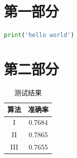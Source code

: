 \documentclass[a4paper,12pt]{report}
\begin{document}
\begin{appendix}

\chapter{第一部分}

\begin{lstlisting}[language=python]
print('hello world') 
\end{lstlisting}

\chapter{第二部分}

\begin{table}[htbp]
    \centering
    \caption{测试结果}
    \label{tab:my-table}
    \begin{tabular}{@{}cc@{}}
    \toprule
    算法 & 准确率 \\ \midrule
    I & 0.7684 \\
    II & 0.7865 \\
    III & 0.7655 \\ \bottomrule
    \end{tabular}
\end{table}

\end{appendix}
\end{document}
